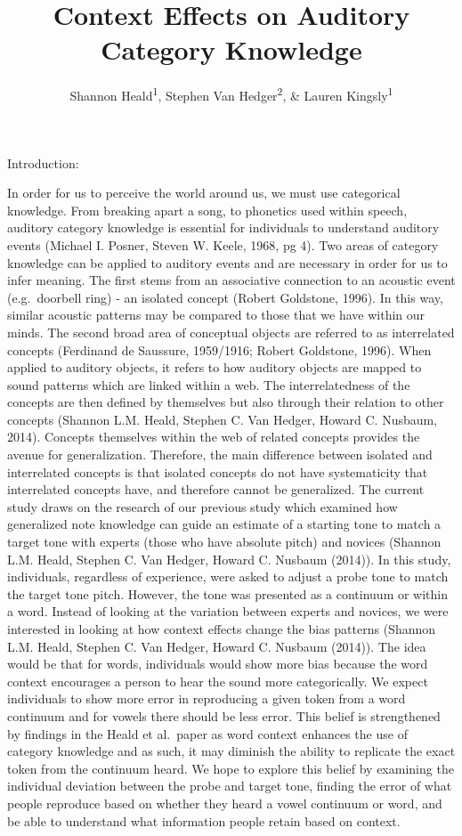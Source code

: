 \documentclass[
  man]{apa6}
\title{Context Effects on Auditory Category Knowledge}
\author{Shannon Heald\textsuperscript{1}, Stephen Van Hedger\textsuperscript{2}, \& Lauren Kingsly\textsuperscript{1}}
\date{}
\affiliation{\vspace{0.5cm}\textsuperscript{1} University of Chicago\\\textsuperscript{2} University of Western Ontario}
\begin{document}
\maketitle

Introduction:

In order for us to perceive the world around us, we must use categorical knowledge. From breaking apart a song, to phonetics used within speech, auditory category knowledge is essential for individuals to understand auditory events (Michael I. Posner, Steven W. Keele, 1968, pg 4).
Two areas of category knowledge can be applied to auditory events and are necessary in order for us to infer meaning. The first stems from an associative connection to an acoustic event (e.g.~doorbell ring) - an isolated concept (Robert Goldstone, 1996). In this way, similar acoustic patterns may be compared to those that we have within our minds. The second broad area of conceptual objects are referred to as interrelated concepts (Ferdinand de Saussure, 1959/1916; Robert Goldstone, 1996). When applied to auditory objects, it refers to how auditory objects are mapped to sound patterns which are linked within a web. The interrelatedness of the concepts are then defined by themselves but also through their relation to other concepts (Shannon L.M. Heald, Stephen C. Van Hedger, Howard C. Nusbaum, 2014). Concepts themselves within the web of related concepts provides the avenue for generalization. Therefore, the main difference between isolated and interrelated concepts is that isolated concepts do not have systematicity that interrelated concepts have, and therefore cannot be generalized. The current study draws on the research of our previous study which examined how generalized note knowledge can guide an estimate of a starting tone to match a target tone with experts (those who have absolute pitch) and novices (Shannon L.M. Heald, Stephen C. Van Hedger, Howard C. Nusbaum (2014)). In this study, individuals, regardless of experience, were asked to adjust a probe tone to match the target tone pitch. However, the tone was presented as a continuum or within a word. Instead of looking at the variation between experts and novices, we were interested in looking at how context effects change the bias patterns (Shannon L.M. Heald, Stephen C. Van Hedger, Howard C. Nusbaum (2014)). The idea would be that for words, individuals would show more bias because the word context encourages a person to hear the sound more categorically. We expect individuals to show more error in reproducing a given token from a word continuum and for vowels there should be less error. This belief is strengthened by findings in the Heald et al.~paper as word context enhances the use of category knowledge and as such, it may diminish the ability to replicate the exact token from the continuum heard. We hope to explore this belief by examining the individual deviation between the probe and target tone, finding the error of what people reproduce based on whether they heard a vowel continuum or word, and be able to understand what information people retain based on context.
\end{document}
